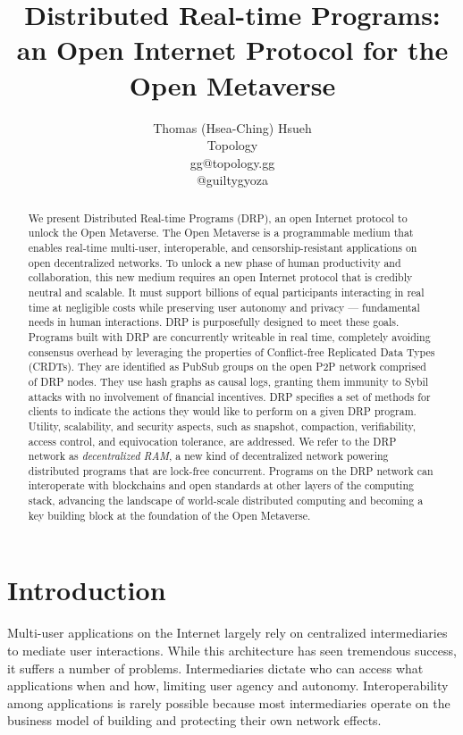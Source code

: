 \documentclass{article}
\title{Distributed Real-time Programs: an Open Internet Protocol for the Open Metaverse}
\author{
 Thomas (Hsea-Ching) Hsueh \\
 Topology \\
 gg@topology.gg \\
 @guiltygyoza
}
\begin{document}
\maketitle


\begin{abstract}

We present Distributed Real-time Programs (DRP), an open Internet protocol to unlock the Open Metaverse. The Open Metaverse is a programmable medium that enables real-time multi-user, interoperable, and censorship-resistant applications on open decentralized networks. To unlock a new phase of human productivity and collaboration, this new medium requires an open Internet protocol that is credibly neutral and scalable. It must support billions of equal participants interacting in real time at negligible costs while preserving user autonomy and privacy — fundamental needs in human interactions. DRP is purposefully designed to meet these goals. Programs built with DRP are concurrently writeable in real time, completely avoiding consensus overhead by leveraging the properties of Conflict-free Replicated Data Types (CRDTs). They are identified as PubSub groups on the open P2P network comprised of DRP nodes. They use hash graphs as causal logs, granting them immunity to Sybil attacks with no involvement of financial incentives. DRP specifies a set of methods for clients to indicate the actions they would like to perform on a given DRP program. Utility, scalability, and security aspects, such as snapshot, compaction, verifiability, access control, and equivocation tolerance, are addressed. We refer to the DRP network as \textit{decentralized RAM}, a new kind of decentralized network powering distributed programs that are lock-free concurrent. Programs on the DRP network can interoperate with blockchains and open standards at other layers of the computing stack, advancing the landscape of world-scale distributed computing and becoming a key building block at the foundation of the Open Metaverse.
\end{abstract}



\section{Introduction}
Multi-user applications on the Internet largely rely on centralized intermediaries to mediate user interactions. While this architecture has seen tremendous success, it suffers a number of problems. Intermediaries dictate who can access what applications when and how, limiting user agency and autonomy. Interoperability among applications is rarely possible because most intermediaries operate on the business model of building and protecting their own network effects.
\end{document}
